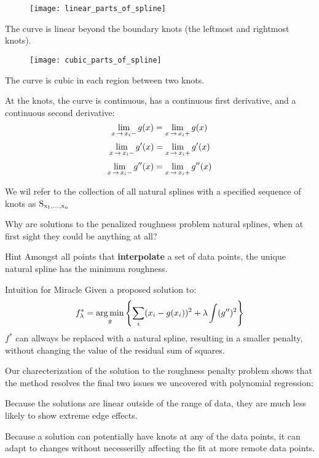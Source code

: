 %
%
\begin{frame}
  \begin{figure}
    \texttt{[image: linear\_parts\_of\_spline]}
  \end{figure}
  The curve is linear beyond the boundary knots (the leftmost and rightmost knots).
\end{frame}
%
%
\begin{frame}
  \begin{figure}
    \texttt{[image: cubic\_parts\_of\_spline]}
  \end{figure}
  The curve is cubic in each region between two knots.
\end{frame}
%
%
\begin{frame}
  At the knots, the curve is continuous, has a continuous first derivative, and a continuous second derivative:
  $$ \lim_{x \operatorname*{\rightarrow} x_i -} g(x) =\lim_{x \operatorname*{\rightarrow} x_i +} g(x) $$
  $$ \lim_{x \operatorname*{\rightarrow} x_i -} g'(x) =\lim_{x \operatorname*{\rightarrow} x_i +} g'(x) $$
  $$ \lim_{x \operatorname*{\rightarrow} x_i -} g''(x) =\lim_{x \operatorname*{\rightarrow} x_i +} g''(x) $$
\end{frame}
%
%
\begin{frame}
  We wil refer to the collection of all natural splines with a specified sequence of knots as ${\operatorname*{S_{x_1, \ldots, x_n}}}$
\end{frame}
%
%
\begin{frame}
  Why are solutions to the penalized roughness problem natural splines, when at first sight they could be anything at all?
\end{frame}
%
%
\begin{frame}
  \begin{block}{Hint}
    Amongst all points that \textbf{interpolate} a set of data points, the unique natural spline has the minimum roughness.
  \end{block}
\end{frame}
%
%
\begin{frame}
  \begin{block}{Intuition for Miracle}
    Given a proposed solution to:
    $$ f_{\lambda}^* = \operatorname*{arg\,min}_{g} \left\{ \sum_i (x_i - g(x_i))^2 + \lambda \int (g'')^2 \right\} $$
    $f^*$ can allways be replaced with a natural spline, resulting in a smaller penalty, without changing the value of the residual sum of squares.
  \end{block}
\end{frame}
%
%
\begin{frame}
  Our charecterization of the solution to the roughness penalty problem shows that the method resolves the final two issues we uncovered with polynomial regression:
\end{frame}
%
%
\begin{frame}
  Because the solutions are linear outside of the range of data, they are much less likely to show extreme edge effects.
\end{frame}
%
%
\begin{frame}
  Because a solution can potentially have knots at any of the data points, it can adapt to changes without necesserilly affecting the fit at more remote data points.
\end{frame}
